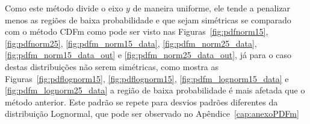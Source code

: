 Como este método divide o eixo $ y $ de maneira uniforme, ele tende a penalizar menos as regiões de baixa probabilidade e que sejam simétricas se comparado com o método \ac{CDFm} como pode ser visto nas Figuras~\ref{fig:pdfnorm15}, \ref{fig:pdfnorm25}, \ref{fig:pdfm_norm15_data}, \ref{fig:pdfm_norm25_data}, \ref{fig:pdfm_norm15_data_out} e \ref{fig:pdfm_norm25_data_out}, já para o caso destas distribuições não serem simétricas, como mostra as Figuras~\ref{fig:pdflognorm15}, \ref{fig:pdflognorm15}, \ref{fig:pdfm_lognorm15_data} e \ref{fig:pdfm_lognorm25_data} a região de baixa probabilidade é mais afetada que o método anterior. Este padrão se repete para desvios padrões diferentes da distribuição Lognormal, que pode ser observado no Apêndice~\ref{cap:anexoPDFm}

